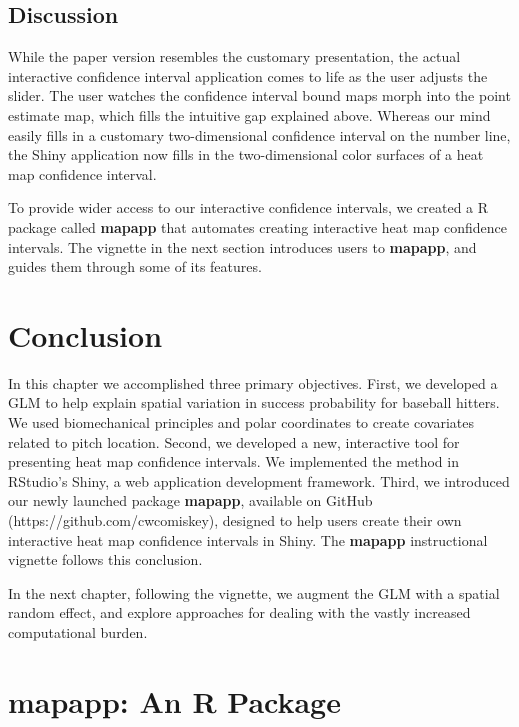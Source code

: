 \subsection{Discussion}

While the paper version resembles the customary presentation, the actual interactive confidence interval application comes to life as the user adjusts the slider. The user watches the confidence interval bound maps morph into the point estimate map, which fills the intuitive gap explained above. Whereas our mind easily fills in a customary two-dimensional confidence interval on the number line, the Shiny application now fills in the two-dimensional color surfaces of a heat map confidence interval.

To provide wider access to our interactive confidence intervals, we created a R package called {\bf mapapp} that automates creating interactive heat map confidence intervals. The vignette in the next section introduces users to {\bf mapapp}, and guides them through some of its features. 

\section{Conclusion}

In this chapter we accomplished three primary objectives. First, we developed a GLM to help explain spatial variation in success probability for baseball hitters. We used biomechanical principles and polar coordinates to create covariates related to pitch location. Second, we developed a new, interactive tool for presenting heat map confidence intervals. We implemented the method in RStudio's Shiny, a web application development framework. Third, we introduced our newly launched package {\bf mapapp}, available on GitHub (https://github.com/cwcomiskey), designed to help users create their own interactive heat map confidence intervals in Shiny. The {\bf mapapp} instructional vignette follows this conclusion.

In the next chapter, following the vignette, we augment the GLM with a spatial random effect, and explore approaches for dealing with the vastly increased computational burden.

\section{mapapp: An R Package}





